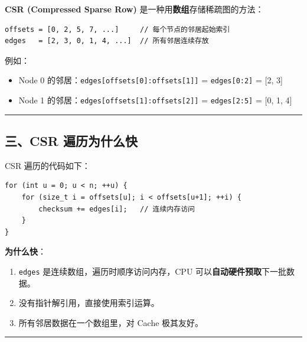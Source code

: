 \documentclass[11pt, a4paper]{article}
\begin{document}
\begin{aibox}
\textbf{CSR (Compressed Sparse Row)} 是一种用\textbf{数组}存储稀疏图的方法：

\begin{tcolorbox}[colback=white,colframe=gray!50!white,boxrule=0.5pt,arc=2pt,left=5pt,right=5pt,top=5pt,bottom=5pt]
\begin{verbatim}
offsets = [0, 2, 5, 7, ...]     // 每个节点的邻居起始索引
edges   = [2, 3, 0, 1, 4, ...]  // 所有邻居连续存放
\end{verbatim}
\end{tcolorbox}

例如：
\begin{itemize}
    \item Node 0 的邻居：\texttt{edges[offsets[0]:offsets[1]]} = \texttt{edges[0:2]} = [2, 3]
    \item Node 1 的邻居：\texttt{edges[offsets[1]:offsets[2]]} = \texttt{edges[2:5]} = [0, 1, 4]
\end{itemize}

\begin{center}\rule{\textwidth}{0.4pt}\end{center}

\subsection*{三、CSR 遍历为什么快}

CSR 遍历的代码如下：

\begin{tcolorbox}[colback=white,colframe=gray!50!white,boxrule=0.5pt,arc=2pt,left=5pt,right=5pt,top=5pt,bottom=5pt]
\begin{verbatim}
for (int u = 0; u < n; ++u) {
    for (size_t i = offsets[u]; i < offsets[u+1]; ++i) {
        checksum += edges[i];   // 连续内存访问
    }
}
\end{verbatim}
\end{tcolorbox}

\textbf{为什么快}：
\begin{enumerate}
    \item \texttt{edges} 是连续数组，遍历时顺序访问内存，CPU 可以\textbf{自动硬件预取}下一批数据。
    \item 没有指针解引用，直接使用索引运算。
    \item 所有邻居数据在一个数组里，对 Cache 极其友好。
\end{enumerate}

\begin{center}\rule{\textwidth}{0.4pt}\end{center}


\end{aibox}
\end{document}
